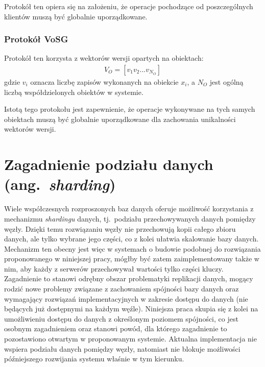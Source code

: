 Protokół ten opiera się na założeniu, że operacje pochodzące od poszczególnych klientów muszą być globalnie uporządkowane.

\subsubsection{Protokół VoSG}

Protokół ten korzysta z wektorów wersji opartych na obiektach:
\begin{align*}
    V_O = [v_1 v_2 ... v_{N_O}]
\end{align*}
gdzie $ v_i $ oznacza liczbę zapisów wykonanych na obiekcie $ x_i $, a $ N_O $ jest ogólną liczbą współdzielonych obiektów w systemie.

Istotą tego protokołu jest zapewnienie, że operacje wykonywane na tych samych obiektach muszą być globalnie uporządkowane dla zachowania unikalności wektorów wersji.

\section{Zagadnienie podziału danych (ang.\ \textit{sharding})}

Wiele współczesnych rozproszonych baz danych oferuje możliwość korzystania z mechanizmu
\textit{shardingu} danych, tj.\ podziału przechowywanych danych pomiędzy węzły. Dzięki temu rozwiązaniu węzły nie przechowują kopii całego zbioru danych, ale tylko wybrane jego części, co z kolei ułatwia skalowanie bazy danych. Mechanizm ten obecny jest więc w systemach o budowie podobnej do rozwiązania proponowanego w niniejszej pracy, mógłby być zatem zaimplementowany także w nim, aby każdy z serwerów przechowywał wartości tylko części kluczy. Zagadnienie to stanowi odrębny obszar problematyki replikacji danych, mogący rodzić nowe problemy związane z zachowaniem spójności bazy danych oraz wymagający rozwiązań implementacyjnych w zakresie dostępu do danych (nie będących już dostępnymi na każdym węźle). Niniejsza praca skupia się z kolei na umożliwieniu dostępu do danych z określonym poziomem spójności, co jest osobnym zagadnieniem oraz stanowi powód, dla którego zagadnienie to pozostawiono otwartym w proponowanym systemie. Aktualna implementacja nie wspiera podziału danych pomiędzy węzły, natomiast nie blokuje możliwości późniejszego rozwijania systemu właśnie w tym kierunku.
